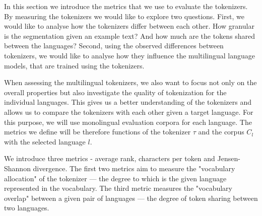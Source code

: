 

In this section we introduce the metrics that we use to evaluate the tokenizers. By measuring the tokenizers we would like to explore two questions. First, we would like to analyse how the tokenizers differ between each other. How granular is the segmentation given an example text? And how much are the tokens shared between the languages? Second, using the observed differences between tokenizers, we would like to analyse how they influence the multilingual language models, that are trained using the tokenizers. %

When assessing the multilingual tokenizers, we also want to focus not only on the overall properties but also investigate the quality of tokenization for the individual languages. This gives us a better understanding of the tokenizers and allows us to compare the tokenizers with each other given a target language. For this purpose, we will use monolingual evaluation corpora for each language. The metrics we define will be therefore functions of the tokenizer $\tau$ and the corpus $C_l$ with the selected language $l$. 

We introduce three metrics - average rank, characters per token and Jensen-Shannon divergence. The first two metrics aim to measure the "vocabulary allocation" of the tokenizer --- the degree to which is the given language represented in the vocabulary. The third metric measures the "vocabulary overlap" between a given pair of languages --- the degree of token sharing between two languages.


